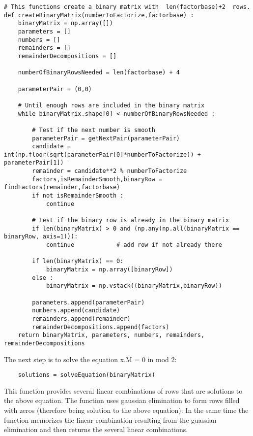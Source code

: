 \documentclass{article}
\begin{document}
\begin{verbatim}
# This functions create a binary matrix with  len(factorbase)+2  rows.
def createBinaryMatrix(numberToFactorize,factorbase) :
    binaryMatrix = np.array([])
    parameters = []
    numbers = []
    remainders = []
    remainderDecompositions = []
    
    numberOfBinaryRowsNeeded = len(factorbase) + 4
    
    parameterPair = (0,0)

    # Until enough rows are included in the binary matrix
    while binaryMatrix.shape[0] < numberOfBinaryRowsNeeded : 
    
        # Test if the next number is smooth
        parameterPair = getNextPair(parameterPair)
        candidate = int(np.floor(sqrt(parameterPair[0]*numberToFactorize)) + parameterPair[1])
        remainder = candidate**2 % numberToFactorize
        factors,isRemainderSmooth,binaryRow = findFactors(remainder,factorbase)
        if not isRemainderSmooth :
            continue
    
        # Test if the binary row is already in the binary matrix
        if len(binaryMatrix) > 0 and (np.any(np.all(binaryMatrix == binaryRow, axis=1))):
            continue            # add row if not already there 
    
        if len(binaryMatrix) == 0:
            binaryMatrix = np.array([binaryRow])
        else :
            binaryMatrix = np.vstack((binaryMatrix,binaryRow))
    
        parameters.append(parameterPair)
        numbers.append(candidate)
        remainders.append(remainder)
        remainderDecompositions.append(factors)
    return binaryMatrix, parameters, numbers, remainders, remainderDecompositions
\end{verbatim}

The next step is to solve the equation x.M = 0 in mod 2:
\begin{verbatim}
    solutions = solveEquation(binaryMatrix)
\end{verbatim}

This function provides several linear combinations of rows that are solutions to the above equation. The function uses gaussian elimination to form rows filled with zeros (therefore being solution to the above equation). In the same time the function memorizes the linear combination resulting from the guassian elimination and then returns the several linear combinations.
\end{document}
